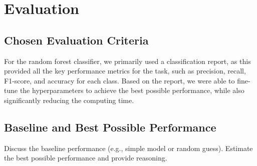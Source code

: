 \section{Evaluation}

\subsection{Chosen Evaluation Criteria}
For the random forest classifier, we primarily used a classification report, as this provided all the key performance metrics for the task, such as precision, recall, F1-score, and accuracy for each class. Based on the report, we were able to fine-tune the hyperparameters to achieve the best possible performance, while also significantly reducing the computing time.

\subsection{Baseline and Best Possible Performance}
Discuss the baseline performance (e.g., simple model or random guess). Estimate the best possible performance and provide reasoning.
